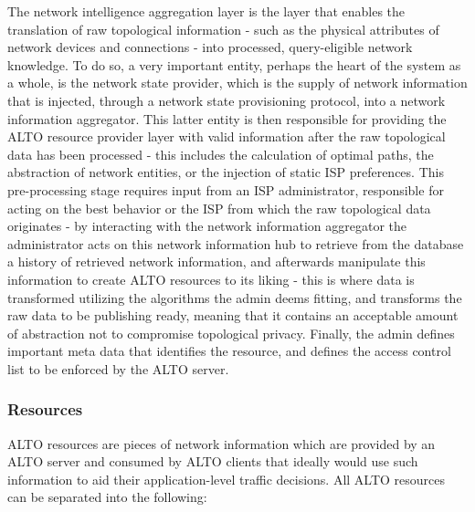     The network intelligence aggregation layer is the layer that enables the translation of raw topological information - such as the physical attributes of network devices and connections - into processed, query-eligible network knowledge.
    To do so, a very important entity, perhaps the heart of the system as a whole, is the network state provider, which is the supply of network information that is injected, through a network state provisioning protocol, into a network information aggregator.
    This latter entity is then responsible for providing the ALTO resource provider layer with valid information after the raw topological data has been processed - this includes the calculation of optimal paths, the abstraction of network entities, or the injection of static ISP preferences.
    This pre-processing stage requires input from an ISP administrator, responsible for acting on the best behavior or the ISP from which the raw topological data originates - by interacting with the network information aggregator the administrator acts on this network information hub to retrieve from the database a history of retrieved network information, and afterwards manipulate this information to create ALTO resources to its liking - this is where data is transformed utilizing the algorithms the admin deems fitting, and transforms the raw data to be publishing ready, meaning that it contains an acceptable amount of abstraction not to compromise topological privacy.
    Finally, the admin defines important meta data that identifies the resource, and defines the access control list to be enforced by the ALTO server.

\subsubsection{Resources}
\label{ssec:alto-resources}

    ALTO resources are pieces of network information which are provided by an ALTO server and consumed by ALTO clients that ideally would use such information to aid their application-level traffic decisions.
    All ALTO resources can be separated into the following:

